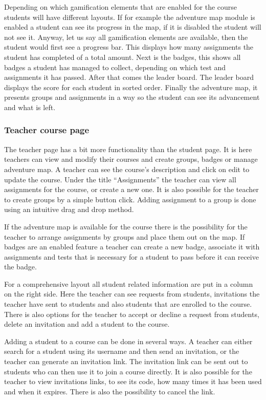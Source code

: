 Depending on which gamification elements that are enabled for the course students will have different layouts. If for example the adventure map module is enabled a student can see its progress in the map, if it is disabled the student will not see it. Anyway, let us say all gamification elements are available, then the student would first see a progress bar. This displays how many assignments the student has completed of a total amount. Next is the badges, this shows all badges a student has managed to collect, depending on which test and assignments it has passed. After that comes the leader board. The leader board displays the score for each student in sorted order. Finally the adventure map, it presents groups and assignments in a way so the student can see its advancement and what is left. 

\subsubsection{Teacher course page}
The teacher page has a bit more functionality than the student page. It is here teachers can view and modify their courses and create groups, badges or manage adventure map. A teacher can see the course's description and click on edit to update the course. Under the title ``Assignments'' the teacher can view all assignments for the course, or create a new one. It is also possible for the teacher to create groups by a simple button click. Adding assignment to a group is done using an intuitive drag and drop method. 

If the adventure map is available for the course there is the possibility for the teacher to arrange assignments by groups and place them out on the map. If badges are an enabled feature a teacher can create a new badge, associate it with assignments and tests that is necessary for a student to pass before it can receive the badge.

For a comprehensive layout all student related information are put in a column on the right side. Here the teacher can see requests from students, invitations the teacher have sent to students and also students that are enrolled to the course. There is also options for the teacher to accept or decline a request from students, delete an invitation and add a student to the course. 

Adding a student to a course can be done in several ways. A teacher can either search for a student using its username and then send an invitation, or the teacher can generate an invitation link. The invitation link can be sent out to students who can then use it to join a course directly. It is also possible for the teacher to view invitations links, to see its code, how many times it has been used and when it expires. There is also the possibility to cancel the link.

